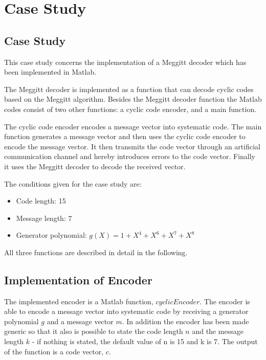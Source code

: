 \documentclass[Main]{subfiles}
\begin{document}
\section{Case Study}

%
%
%

\subsection{Case Study}
This case study concerns the implementation of a Meggitt decoder which has been implemented in Matlab. 

\noindent The Meggitt decoder is implemented as a function that can decode cyclic codes based on the Meggitt algorithm. Besides the Meggitt decoder function the Matlab codes consist of two other functions: a cyclic code encoder, and a main function.

\noindent The cyclic code encoder encodes a message vector into systematic code. The main function generates a message vector and then uses the cyclic code encoder to encode the message vector. It then transmits the code vector through an artificial communication channel and hereby introduces errors to the code vector. Finally it uses the Meggitt decoder to decode the received vector. 

\noindent The conditions given for the case study are: 
\begin{itemize} \itemsep0pt \parskip0pt 
\item Code length: 15
\item Message length: 7
\item Generator polynomial: $g(X)=1+X^4+X^6+X^7+X^8$
\end{itemize} 

\noindent All three functions are described in detail in the following. 


\subsection{Implementation of Encoder}
\label{sec:ImplementEncoder}
The implemented encoder is a Matlab function, $cyclicEncoder$. The encoder is able to encode a message vector into systematic code by receiving a generator polynomial $g$ and a message vector $m$. In addition the encoder has been made generic so that it also is possible to state the code length $n$ and the message length $k$ - if nothing is stated, the default value of n is 15 and k is 7. The output of the function is a code vector, $c$. 
\end{document}
